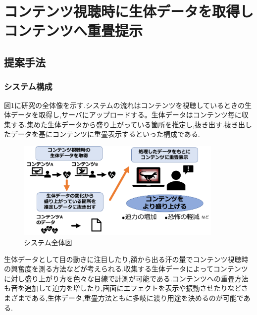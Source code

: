 \chapter{コンテンツ視聴時に生体データを取得しコンテンツへ重畳提示}

\thispagestyle{myheadings}

\section{提案手法}

\subsection{システム構成}
図1に研究の全体像を示す.システムの流れはコンテンツを視聴しているときの生体データを取得し,サーバにアップロードする。生体データはコンテンツ毎に収集する.集めた生体データから盛り上がっている箇所を推定し,抜き出す.抜き出したデータを基にコンテンツに重畳表示するといった構成である.
\begin{figure}[H]
    \centering
    \includegraphics[width=10cm]{images/chapter3/zenntaizu.png}
    \caption{システム全体図}
\end{figure}
生体データとして目の動きに注目したり,額から出る汗の量でコンテンツ視聴時の興奮度を測る方法などが考えられる.収集する生体データによってコンテンツに対し盛り上がり方を色々な目線で計測が可能である.コンテンツへの重畳方法も音を追加して迫力を増したり,画面にエフェクトを表示や振動させたりなどさまざまである,生体データ,重畳方法ともに多岐に渡り用途を決めるのが可能である.


